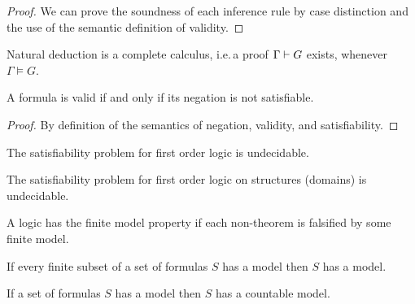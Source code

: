 \begin{proof}
	We can prove the soundness of each inference rule by case distinction and the use of the semantic definition of validity.
\end{proof}



\begin{theorem}
	Natural deduction is a complete calculus,
	i.e.\,a proof \( \Gamma\vdash G \) exists,
	whenever \( \Gamma\models G \).
\end{theorem}




\begin{lemma}[Refutation]
	A formula is valid if and only if its negation is not satisfiable.
\end{lemma}
\begin{proof}
By definition of the semantics of negation, validity, and satisfiability.
\end{proof}

\begin{theorem}
	The satisfiability problem for first order logic is undecidable.
\end{theorem}

\begin{theorem}
	The satisfiability problem for first order logic on  structures (domains) is undecidable.
\end{theorem}

\begin{definition}
	A logic has the finite model property if each non-theorem is falsified by some finite model.
\end{definition}

\begin{theorem}\label{the:compactness}
	If every finite subset of a set of formulas \( S \) has a model then \( S \) has a model.
\end{theorem}

\begin{theorem}\label{the:loewenheim}
	If a set of formulas \( S \) has a model then \( S \) has a countable model.
\end{theorem}

